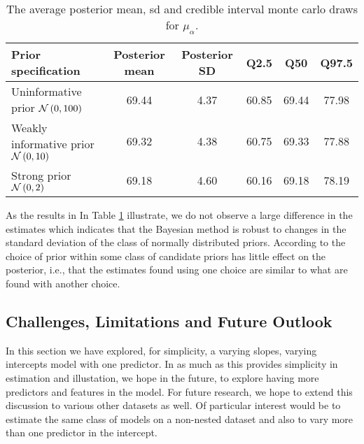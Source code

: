 \begin{table}[!ht]
	\begin{center}
		\begin{tabular}{l | c c c c c}
			Prior specification & Posterior mean & Posterior SD & Q2.5 & Q50 & Q97.5\\
			\hline
			Uninformative prior $\mathcal{N}\left(0,100\right)$ & 69.44 & 4.37 & 60.85 & 69.44 & 77.98 \\
			Weakly informative prior $\mathcal{N}\left(0,10\right)$ & 69.32 &   4.38  & 60.75 &   69.33 &   77.88 \\
			Strong prior $\mathcal{N}\left(0,2\right)$ & 69.18 & 4.60 &  60.16 &  69.18  & 78.19
		\end{tabular}
	\end{center}
	\caption{The average posterior mean, sd and credible interval monte carlo draws for $\mu_{\alpha}$.}
	\label{tab:robustness}
\end{table} 
As the results in In Table \ref{tab:robustness} illustrate, we do not observe a large difference in the estimates which indicates that the Bayesian method is robust to changes in the standard deviation of the class of normally distributed priors. According to \cite{edwards1963bayesian}  the choice of prior within some class of candidate priors has little effect on the posterior, i.e., that the estimates found using one choice are similar to what are found with another choice.  

\subsection{Challenges, Limitations and Future Outlook}

In this section we have explored, for simplicity, a varying slopes, varying intercepts model with one predictor. In as much as this provides simplicity in estimation and illustation, we hope in the future, to explore having more predictors and features in the model. For future research, we hope to extend this discussion to various other datasets as well. Of particular interest would be to estimate the same class of models on a non-nested dataset and also to vary more than one predictor in the intercept. 


